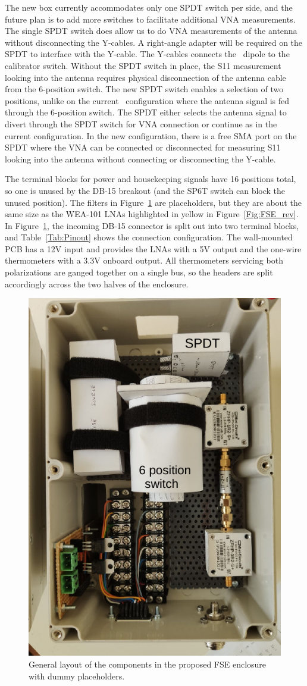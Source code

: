 The new box currently accommodates only one SPDT switch per side, and the future plan is to add more switches to facilitate additional VNA measurements. The single SPDT switch does allow us to do VNA measurements of the antenna without disconnecting the Y-cables. A right-angle adapter will be required on the SPDT to interface with the Y-cable. The Y-cables connects the \prizm\ dipole to the calibrator switch. Without the SPDT switch in place, the S11 measurement looking into the antenna requires physical disconnection of the antenna cable from the 6-position switch. The new SPDT switch enables a selection of two positions, unlike on the current \prizm\ configuration where the antenna signal is fed through the 6-position switch. The SPDT either selects the antenna signal to divert through the SPDT switch for VNA connection or continue as in the current configuration. In the new configuration, there is a free SMA port on the SPDT where the VNA can be connected or disconnected for measuring S11 looking into the antenna without connecting or disconnecting the Y-cable. 

The terminal blocks for power and housekeeping signals have 16 positions total, so one is unused by the DB-15 breakout (and the SP6T switch can block the unused position). The filters in Figure~\ref{Fig:FSE_archi} are placeholders, but they are about the same size as the WEA-101 LNAs highlighted in yellow in Figure~\ref{Fig:FSE_rev}. In Figure~\ref{Fig:FSE_archi}, the incoming DB-15 connector is split out into two terminal blocks, and Table~\ref{Tab:Pinout} shows the connection configuration. The wall-mounted PCB has a 12V input and provides the LNAs with a 5V output and the one-wire thermometers with a 3.3V onboard output. All thermometers servicing both polarizations are ganged together on a single bus, so the headers are split accordingly across the two halves of the enclosure.

\begin{figure}
	\centering
	\includegraphics[width=0.5\linewidth]{Figures/FSE_archi}
	\caption{General layout of the components in the proposed FSE enclosure with dummy placeholders.}
	\label{Fig:FSE_archi}
\end{figure}

